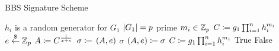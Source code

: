 \begin{algorithm}[t]
\caption{BBS Signature Scheme}
\label{alg:bbs}
\begin{algorithmic}[1]
\Require $h_{i}$ is a random generator for $G_{1}$
\Require $\left| G_{1} \right| = p$ prime
\Require $m_{i}\in \mathbb{Z}_{p}$
    \State $C \coloneqq{} g_{1} \prod_{i=1}^{n}h_{i}^{m_{i}}$
    \State $e \stackrel{\$}{\leftarrow}{} \mathbb{Z}_{p}$
    \State $A \coloneqq{} C^{\frac{1}{x+e}}$
    \State $\sigma \coloneqq{} \left( A,e \right)$
    \State \Return $\sigma$
\EndProcedure
\State
{}
    \State $\left( A,e \right) \coloneqq{} \sigma$
    \State $C \coloneqq{} g_{1} \prod_{i=1}^{n}h_{i}^{m_{i}}$
        \State \Return \textsf{True}
    \Else
        \State \Return \textsf{False}
    \EndIf
\EndProcedure
\end{algorithmic}
\end{algorithm}
